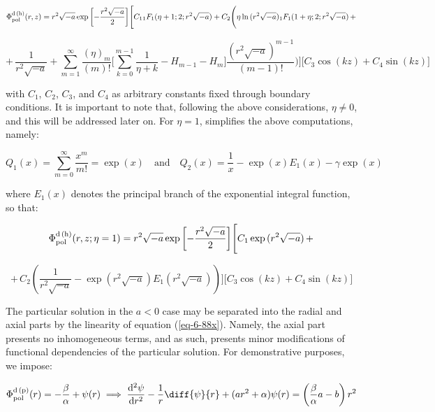 \begin{equation*}
    \Phi_{\text{pol}}^\text{d\,(h)}(r,z)=r^2\sqrt{-a}\exp{\left[-\frac{r^2\sqrt{-a}}{2}\right]}\Bigg[C_1{_1F_1}(\eta+1;2;r^2\sqrt{-a})+C_2\Bigg(\eta\ln{(r^2\sqrt{-a})}{_1F_1}(1+\eta;2;r^2\sqrt{-a})\,+
\end{equation*}

\begin{equation}
    +\,\frac{1}{r^2\sqrt{-a}}+\sum_{m=1}^\infty\frac{(\eta)_m}{(m)!}\bigg[\sum_{k=0}^{m-1}\frac{1}{\eta+k}-H_{m-1}-H_m\bigg]\frac{\left(r^2\sqrt{-a}\right)^{m-1}}{(m-1)!}\Bigg)\Bigg]\Big[C_3\cos{(kz)}+C_4\sin{(kz)}\Big]
\end{equation}

with $C_1$, $C_2$, $C_3$, and $C_4$ as arbitrary constants fixed through boundary conditions. It is important to note that, following the above considerations, $\eta\neq0$, and this will be addressed later on. For $\eta=1$, simplifies the above computations, namely:

\begin{equation}
    Q_1(x)=\sum_{m=0}^\infty\frac{x^m}{m!}=\exp{(x)}\quad\text{and}\quad Q_2(x)=\frac{1}{x}-\exp{(x)}E_1(x)-\gamma\exp{(x)}
\end{equation}

where $E_1(x)$ denotes the principal branch of the exponential integral function, so that:

\begin{equation*}
    \Phi_{\text{pol}}^\text{d\,(h)}(r,z;\eta=1)=r^2\sqrt{-a}\exp{\left[-\frac{r^2\sqrt{-a}}{2}\right]}\Bigg[C_1\exp{(r^2\sqrt{-a})}\,+
\end{equation*}

\begin{equation}
    +\,C_2\left(\frac{1}{r^2\sqrt{-a}}-\exp{(r^2\sqrt{-a})}E_1(r^2\sqrt{-a})\right)\Bigg]\Big[C_3\cos{(kz)}+C_4\sin{(kz)}\Big]
\end{equation}

The particular solution in the $a<0$ case may be separated into the radial and axial parts by the linearity of equation (\ref{eq-6-88x}). Namely, the axial part presents no inhomogeneous terms, and as such, presents minor modifications of functional dependencies of the particular solution. For demonstrative purposes, we impose:

\begin{equation}
    \Phi_{\text{pol}}^\text{d\,(p)}(r)=-\frac{\beta}{\alpha}+\psi(r)\implies\frac{\mathrm{d}^2\psi}{\mathrm{d}r^2}-\frac{1}{r}\diff{\psi}{r}+(ar^2+\alpha)\psi(r)=\left(\frac{\beta}{\alpha}a-b\right)r^2
\end{equation}

